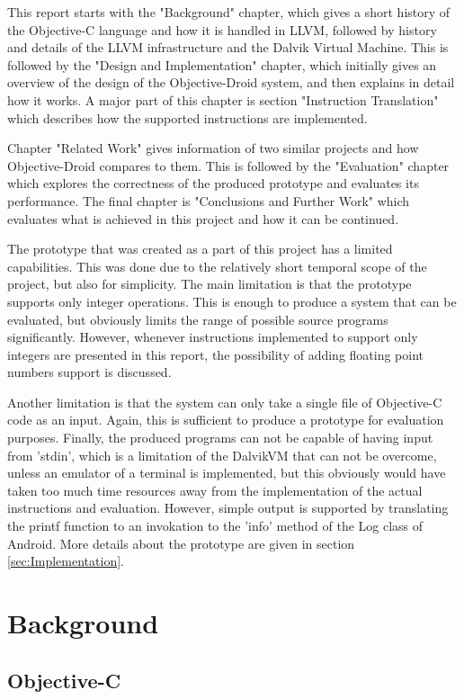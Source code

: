 \documentclass[parskip]{cs4rep}
\begin{document}
This report starts with the "Background" chapter, which gives a short history of the Objective-C language and how it is handled in LLVM, followed by history and details of the LLVM infrastructure and the Dalvik Virtual Machine. This is followed by the "Design and Implementation" chapter, which initially gives an overview of the design of the Objective-Droid system, and then explains in detail how it works. A major part of this chapter is section "Instruction Translation" which describes how the supported instructions are implemented. 

Chapter "Related Work" gives information of two similar projects and how Objective-Droid compares to them. This is followed by the "Evaluation" chapter which explores the correctness of the produced prototype and evaluates its performance. The final chapter is "Conclusions and Further Work" which evaluates what is achieved in this project and how it can be continued.

The prototype that was created as a part of this project has a limited capabilities. This was done due to the relatively short temporal scope of the project, but also for simplicity. The main limitation is that the prototype supports only integer operations. This is enough to produce a system that can be evaluated, but obviously limits the range of possible source programs significantly. However, whenever instructions implemented to support only integers are presented in this report, the possibility of adding floating point numbers support is discussed.

Another limitation is that the system can only take a single file of Objective-C code as an input. Again, this is sufficient to produce a prototype for evaluation purposes. Finally, the produced programs can not be capable of having input from 'stdin', which is a limitation of the DalvikVM that can not be overcome, unless an emulator of a terminal is implemented, but this obviously would have taken too much time resources away from the implementation of the actual instructions and evaluation. However, simple output is supported by translating the printf function to an invokation to the 'info' method of the Log class of Android. More details about the prototype are given in section \ref{sec:Implementation}.

\chapter{Background}

\section{Objective-C}
\end{document}
